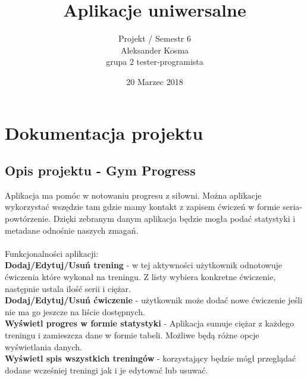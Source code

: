 \documentclass[8pt]{article}
\title{Aplikacje uniwersalne}
\author{Projekt / Semestr 6\\ Aleksander Kosma\\grupa 2 tester-programista}
\date{20 Marzec 2018}
\begin{document}
\maketitle 

\section*{Dokumentacja projektu}
\subsection*{ Opis projektu - Gym Progress}
Aplikacja ma pomóc w notowaniu progresu z siłowni. Można aplikacje wykorzystać wszędzie tam gdzie mamy kontakt z zapisem ćwiczeń w formie seria-powtórzenie. Dzięki zebranym danym aplikacja będzie mogła podać statystyki i metadane odnośnie naszych zmagań.\\
\\

Funkcjonalności aplikacji: \\
\textbf{Dodaj/Edytuj/Usuń trening} - w tej aktywności użytkownik odnotowuje ćwiczenia które wykonał na treningu. Z listy wybiera konkretne ćwiczenie, następnie ustala ilość serii i ciężar.\\

\textbf{Dodaj/Edytuj/Usuń ćwiczenie} - użytkownik może dodać nowe ćwiczenie jeśli nie ma go jeszcze na liście dostępnych.\\

\textbf{Wyświetl progres w formie statystyki} - Aplikacja sumuje ciężar z każdego treningu i zamieszcza dane w formie tabeli. Możliwe będą różne opcje wyświetlania danych.\\

\textbf{Wyświetl spis wszystkich treningów} - korzystający będzie mógł przeglądać dodane wcześniej treningi jak i je edytować lub usuwać.
\end{document}
